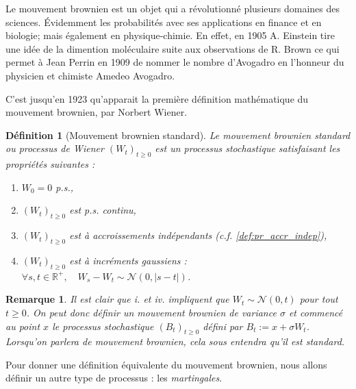 \documentclass[openany]{book}
\newcommand{\R}{\mathbb{R}}
\newcommand{\1}{\mathbbm{1}}
\theoremstyle{thmfont}
\theoremstyle{deffont}
\newtheorem{definition}[definition]{Définition}
\theoremstyle{thmfont}
\theoremstyle{deffont}
\newtheorem{remark}[remark]{Remarque}
\begin{document}
Le mouvement brownien est un objet qui a révolutionné plusieurs domaines des sciences. Évidemment les probabilités avec ses applications en finance et en biologie; mais également en physique-chimie. En effet, en 1905 A. Einstein tire une idée de la dimention moléculaire suite aux observations de R. Brown ce qui permet à Jean Perrin en 1909 de nommer le nombre d'Avogadro en l'honneur du physicien et chimiste Amedeo Avogadro.


C'est jusqu'en 1923 qu'apparait la première définition mathématique du mouvement brownien, par Norbert Wiener.\\

\begin{definition}[Mouvement brownien standard]  \label{def:MvtBorwnien}
  Le \textit{mouvement brownien standard} ou \textit{processus de Wiener} $(W_t)_{t\geq0}$ est un processus stochastique satisfaisant les propriétés suivantes :
  \begin{enumerate}
  \item $W_0 = 0$ p.s.,
  \item $(W_t)_{t\geq0}$ est p.s. continu,
  \item $(W_t)_{t\geq0}$ est à accroissements indépendants (c.f. \autoref{def:pr_accr_indep}),
  \item $(W_t)_{t \geq 0}$ est à incréments gaussiens : $\forall s, t \in \R^+,\quad W_s - W_t \sim \mathcal{N}(0,|s-t|)$.
  \end{enumerate}
\end{definition}

\begin{remark}
  Il est clair que \textit{i.} et \textit{iv.} impliquent que $W_t \sim \mathcal{N}(0,t)$ pour tout $t \geq 0$. On peut donc définir un mouvement brownien de variance $\sigma$ et commencé au point $x$ le processus stochastique $(B_t)_{t\geq0}$ défini par $B_t := x + \sigma W_t$. Lorsqu'on parlera de mouvement brownien, cela sous entendra qu'il est standard.
\end{remark}

Pour donner une définition équivalente du mouvement brownien, nous allons définir un autre type de processus : les \textit{martingales}.
\end{document}
